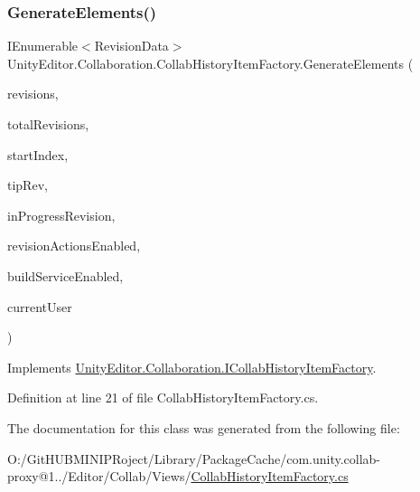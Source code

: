 \subsubsection{\texorpdfstring{GenerateElements()}{GenerateElements()}}
{\footnotesize\ttfamily I\+Enumerable$<$Revision\+Data$>$ Unity\+Editor.\+Collaboration.\+Collab\+History\+Item\+Factory.\+Generate\+Elements (\begin{DoxyParamCaption}\item[{I\+Enumerable$<$ Revision $>$}]{revisions,  }\item[{int}]{total\+Revisions,  }\item[{int}]{start\+Index,  }\item[{string}]{tip\+Rev,  }\item[{string}]{in\+Progress\+Revision,  }\item[{bool}]{revision\+Actions\+Enabled,  }\item[{bool}]{build\+Service\+Enabled,  }\item[{string}]{current\+User }\end{DoxyParamCaption})}



Implements \mbox{\hyperlink{interface_unity_editor_1_1_collaboration_1_1_i_collab_history_item_factory_a82679f4deecbbb2a95fc125228a6a22e}{Unity\+Editor.\+Collaboration.\+I\+Collab\+History\+Item\+Factory}}.



Definition at line 21 of file Collab\+History\+Item\+Factory.\+cs.



The documentation for this class was generated from the following file\+:\begin{DoxyCompactItemize}
\item 
O\+:/\+Git\+H\+U\+B\+M\+I\+N\+I\+P\+Roject/\+Library/\+Package\+Cache/com.\+unity.\+collab-\/proxy@1../\+Editor/\+Collab/\+Views/\mbox{\hyperlink{_collab_history_item_factory_8cs}{Collab\+History\+Item\+Factory.\+cs}}\end{DoxyCompactItemize}
